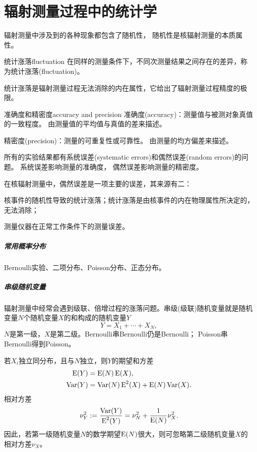 \chapter{辐射测量过程中的统计学}
辐射测量中涉及到的各种现象都包含了随机性，
随机性是核辐射测量的本质属性。

\begin{definition}{统计涨落}{fluctuation}
	在同样的测量条件下，不同次测量结果之间存在的差异，称为统计涨落(fluctuation)。
\end{definition}
统计涨落是辐射测量过程无法消除的内在属性，它给出了辐射测量过程精度的极限。
\begin{definition}{准确度和精密度}{accuracy and precision}
	准确度(accuracy)：测量值与被测对象真值的一致程度。
	由测量值的平均值与真值的差来描述。

	精密度(precision)：测量的可重复性或可靠性。
	由测量的均方偏差来描述。	
\end{definition}
所有的实验结果都有系统误差(systematic errors)和偶然误差(random errors)的问题。
系统误差影响测量的准确度，
偶然误差影响测量的精密度。

在核辐射测量中，偶然误差是一项主要的误差，其来源有二：
\begin{compactenum}
	\item 核事件的随机性导致的统计涨落；统计涨落是由核事件的内在物理属性所决定的，无法消除；
	\item 测量仪器在正常工作条件下的测量误差。
\end{compactenum}
\paragraph{常用概率分布}
Bernoulli实验、二项分布、Poisson分布、正态分布。
\paragraph{串级随机变量}
辐射测量中经常会遇到级联、倍增过程的涨落问题。串级(级联)随机变量就是随机变量$N$个随机变量$X$的和构成的随机变量$Y$
\begin{equation}\label{eq:nrd-random-sum}
	Y = X_1 + \cdots + X_N,
\end{equation}
$N$是第一级，$X$是第二级。Bernoulli串Bernoulli仍是Bernoulli；
Poisson串Bernoulli得到Poisson。

若$X_i$独立同分布，且与$N$独立，则$Y$的期望和方差
\begin{subequations}\label{eq:nrd-random-sum-moments}
	\begin{align}
		\operatorname{E}(Y) &= \operatorname{E}(N)\operatorname{E}(X),\\
		\operatorname{Var}(Y) &= \operatorname{Var}(N)\operatorname{E}^2(X) + \operatorname{E}(N)\operatorname{Var}(X).
	\end{align}
\end{subequations}
相对方差
\begin{align}
	\nu_Y^2 := \frac{\operatorname{Var}(Y)}{\operatorname{E}^2(Y)} = \nu_N^2 + \frac1{\operatorname{E}(N)}\nu_X^2.
\end{align}
因此，若第一级随机变量$N$的数学期望$\operatorname{E}(N)$很大，则可忽略第二级随机变量$X$的相对方差$\nu_X$。%

